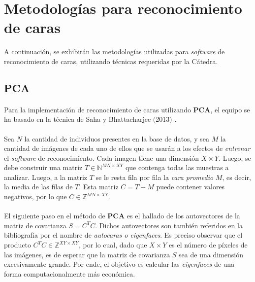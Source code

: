 \documentclass[12pt, twocolumn]{article}
\begin{document}
	\section{Metodologías para reconocimiento de caras}
	
	\paragraph{} A continuación, se exhibirán las metodologías utilizadas para \textit{software} de reconocimiento de caras, utilizando técnicas requeridas por la Cátedra. 	
	
	\subsection{PCA}
	
	\paragraph{} Para la implementación de reconocimiento de caras utilizando \textbf{PCA}, el equipo se ha basado en la técnica de Saha y Bhattacharjee $($2013$)$ \cite{PCA}.
	
	\paragraph{} Sea $N$ la cantidad de individuos presentes en la base de datos, y sea $M$ la cantidad de imágenes de cada uno de ellos que se usarán a los efectos de \textit{entrenar} el \textit{software} de reconocimiento. Cada imagen tiene una dimensión $X\times Y$. Luego, se debe construir una matriz $T \in \mathbb{N}^{MN\times XY}$ que contenga todas las muestras a analizar. Luego, a la matriz $T$ se le resta fila por fila la \textit{cara promedio} $M$, es decir, la media de las filas de $T$. Esta matriz $C = T - M$ puede contener valores negativos, por lo que $C \in \mathbb{Z}^{MN\times XY}$.
	
	\paragraph{} El siguiente paso en el método de \textbf{PCA} es el hallado de los autovectores de la matriz de covarianza $S = C^{T}C$. Dichos autovectores son también referidos en la bibliografía por el nombre de \textit{autocaras o eigenfaces}. Es preciso observar que el producto $C^{T}C \in \mathbb{Z}^{XY\times XY}$, por lo cual, dado que $X\times Y$ es el número de píxeles de las imágenes, es de esperar que la matriz de covarianza $S$ sea de una dimensión excesivamente grande. Por ende, el objetivo es calcular las \textit{eigenfaces} de una forma computacionalmente más económica.
	
\end{document}
